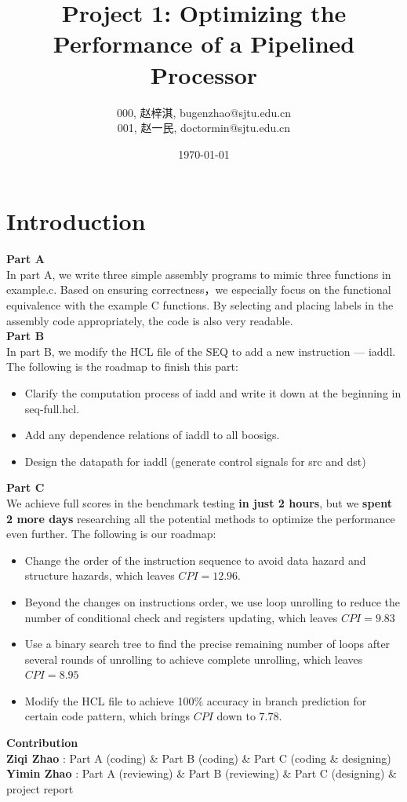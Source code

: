 \documentclass{article}
\title{\textbf{Project 1: Optimizing the Performance of a Pipelined Processor}} %
\author{000, 赵梓淇, bugenzhao@sjtu.edu.cn \\
        001, 赵一民, doctormin@sjtu.edu.cn \\ } %
\date{\today} %
\begin{document}
\maketitle %

\section{Introduction}
\textbf{Part A}
\\
In part A, we write three simple assembly programs to mimic three functions in example.c. 
Based on ensuring correctness，we especially focus on the functional equivalence with the example C functions. 
By selecting and placing labels in the assembly code appropriately, the code is also very readable.\\
\textbf{Part B}
\\
In part B, we modify the HCL file of the SEQ to add a new instruction --- iaddl. 
The following is the roadmap to finish this part:
\begin{itemize}
        \item Clarify the computation process of iadd and write it down at the beginning in seq-full.hcl.
        \item Add any dependence relations of iaddl to all boosigs.
        \item Design the datapath for iaddl (generate control signals for src and dst)
\end{itemize}
\textbf{Part C}
\\
We achieve full scores in the benchmark testing \textbf{in just 2 hours}, 
but we \textbf{spent 2 more days} researching all the potential methods to optimize the performance even further. 
The following is our roadmap:
\begin{itemize}
        \item Change the order of the instruction sequence to avoid data hazard and structure hazards, which leaves $CPI = 12.96$.
        \item Beyond the changes on instructions order, we use loop unrolling to reduce the number of conditional check and registers updating, which leaves $CPI = 9.83$
        \item Use a binary search tree to find the precise remaining number of loops after several rounds of unrolling to achieve complete unrolling, which leaves $CPI = 8.95$
        \item Modify the HCL file to achieve 100\% accuracy in branch prediction for certain code pattern, which brings $CPI$ down to $7.78$.
\end{itemize}
\textbf{Contribution}
\\
\textbf{Ziqi Zhao} : Part A (coding) \& Part B (coding) \& Part C (coding \& designing) \\
\textbf{Yimin Zhao} : Part A (reviewing) \& Part B (reviewing) \& Part C (designing) \& project report
\end{document}
